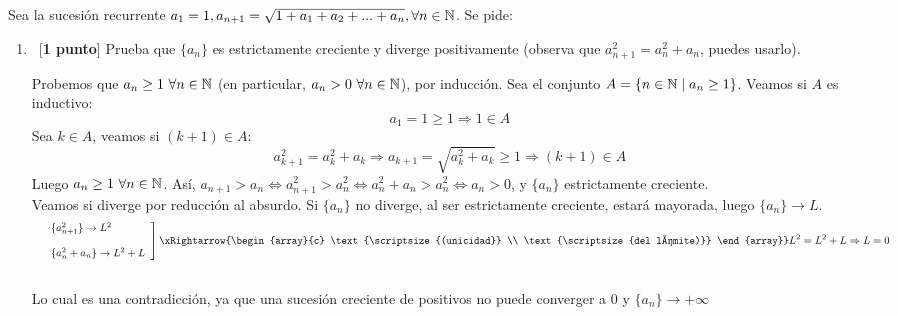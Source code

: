 \documentclass[12pt]{article}
\begin{document}
    \begin{ejercicio}
        Sea la sucesión recurrente $a_1 = 1, a_{n+1} = \sqrt{1 + a_1 + a_2 +  ...  + a_n}, {\forall n \in {\mathbb{N}}}$. Se pide:
        \begin{enumerate}[label=\alph*)]
            \item\ [\textbf{1 punto}] Prueba que $\{a_n\}$ es estrictamente creciente y diverge positivamente (observa que $a^2_{n+1} = a^2_n + a_n$, puedes usarlo).

            Probemos que $a_n \geq 1 \ \forall n \in {\mathbb{N}}$ (en particular, $a_n > 0 \ \forall n \in \N$), por inducción. Sea el conjunto $A = \{n \in {\mathbb{N}} \mid a_n \geq 1\}$. Veamos si $A$ es inductivo:
            \begin{equation*}
                a_1 = 1 \geq 1 \Rightarrow 1 \in A
            \end{equation*}
            Sea $k \in A$, veamos si $(k + 1) \in A$:
            \begin{equation*}
                a_{k+1}^2 = a^2_k + a_k \Rightarrow a_{k+1} = \sqrt{a_k^2 + a_k} \geq 1 \Rightarrow (k + 1) \in A
            \end{equation*}
            Luego $a_n \geq 1 \ \forall n \in {\mathbb{N}}$. Así, $a_{n+1} > a_n \Leftrightarrow a_{n+1}^2 > a_n^2 \Leftrightarrow a_n^2 + a_n > a_n^2 \Leftrightarrow a_n > 0$, y $\{a_n\}$ estrictamente creciente. \\ Veamos si diverge por reducción al absurdo. Si $\{a_n\}$ no diverge, al ser estrictamente creciente, estará mayorada, luego $\{a_n\} \rightarrow L$.
            \begin{equation*}
             \left.\begin{array}{lll}
                  &  \{a_{n+1}^2\} \rightarrow L^2 \\
                  \\
                  &  \{a_n^2 + a_n\} \rightarrow L^2 + L
             \end{array} \right] \xRightarrow{\begin{array}{c}
                    \text{\scriptsize{(unicidad}} \\
                    \text{\scriptsize{del límite)}} 
                \end{array}} L^2 = L^2 + L \Rightarrow L = 0
            \end{equation*}
            \\
            Lo cual es una contradicción, ya que una sucesión creciente de positivos no puede converger a 0 y $\{a_n\} \rightarrow +\infty$
            

\end{enumerate}
\end{ejercicio}
\end{document}
